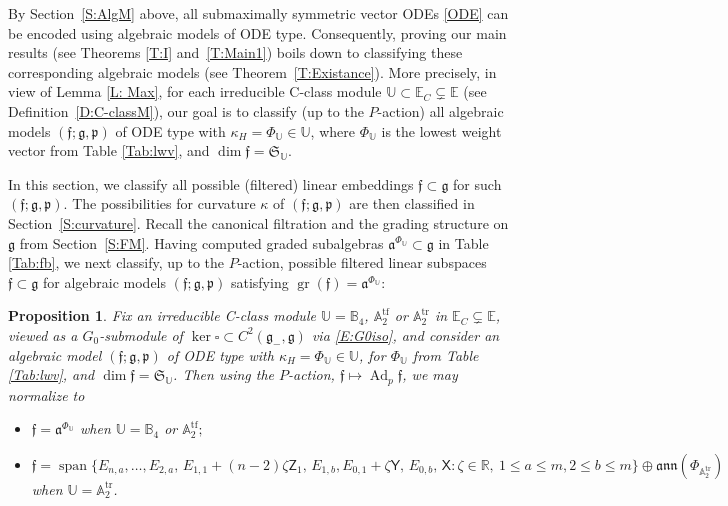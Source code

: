 \documentclass[10pt,a4paper]{amsart}
\DeclareMathOperator{\gr}{gr}
\DeclareMathOperator{\tf}{tf}
\DeclareMathOperator{\tr}{tr}
\DeclareMathOperator{\sn}{span}
\newcommand{\g}{\mathfrak{g}}
\newcommand\Ad{\operatorname{Ad}}
\renewcommand\gr{\operatorname{gr}}
\newcommand\fa{\mathfrak{a}}
\newcommand\fann{\mathfrak{ann}}
\newcommand\ff{\mathfrak{f}}
\newcommand\fg{\mathfrak{g}}
\newcommand\fp{\mathfrak{p}}
\newcommand\fS{\mathfrak{S}}
\newcommand{\R}{\mathbb{R}}
\newcommand\bbE{\mathbb{E}}
\newcommand\bbU{\mathbb{U}}
\newcommand\bbA{\mathbb{A}}
\newcommand\bbB{\mathbb{B}}
\newcommand\sfX{\mathsf{X}}
\newcommand\sfY{\mathsf{Y}}
\newcommand\sfZ{\mathsf{Z}}
\numberwithin{equation}{section}
\newtheorem{Proposition}[Theorem]{Proposition}
 { \theoremstyle{definition}
\newtheorem{Definition}[Theorem]{Definition}
\newtheorem{Note}[Theorem]{Note}
\newtheorem{Example}[Theorem]{Example}
\newtheorem{Remark}[Theorem]{Remark} }
\begin{document}
By Section~\ref{S:AlgM} above, all submaximally symmetric vector ODEs \eqref{ODE} can be encoded using algebraic models of ODE type. Consequently, proving our main results (see Theorems \ref{T:I} and~\ref{T:Main1}) boils down to classifying these corresponding algebraic models (see Theorem~\ref{T:Existance}). More precisely, in view of Lemma \ref{L: Max}, for each irreducible C-class module $\bbU \subset \bbE_C \subsetneq \bbE$ (see Definition~\ref{D:C-classM}), our goal is to classify (up to the $P$-action) all algebraic models $(\ff;\fg,\fp)$ of ODE type with $\kappa_H = \Phi_\bbU \in \bbU$, where $\Phi_\bbU$ is the lowest weight vector from Table \ref{Tab:lwv}, and $\dim \ff = \fS_\bbU$.

In this section, we classify all possible (filtered) linear embeddings $\ff \subset \fg$ for such $(\ff;\fg,\fp)$. The possibilities for curvature $\kappa$ of $(\ff;\fg,\fp)$ are then classified in Section~\ref{S:curvature}. Recall the canonical filtration and the grading structure on $\g$ from Section~\ref{S:FM}. Having computed graded subalgebras $\fa^{\Phi_\bbU} \subset \g$ in Table \ref{Tab:fb}, we next classify, up to the $P$-action, possible filtered linear subspaces $\ff \subset \g$ for algebraic models $(\ff;\fg,\fp)$ satisfying $\gr(\ff) = \fa^{\Phi_\bbU}$:

\begin{Proposition} \label{P:DR}
Fix an irreducible C-class module $\bbU = \bbB_4$, $\bbA_2^{\tf}$ or $\bbA_2^{\tr}$ in $\bbE_C \subsetneq \bbE$, viewed as a $G_0$-submodule of $\ker\square \subset C^2(\fg_-,\fg)$ via \eqref{E:G0iso}, and consider an algebraic model $(\ff;\fg,\fp)$ of ODE type with $ \kappa_H = \Phi_{\bbU}\in \bbU$, for $\Phi_\bbU$ from Table {\rm \ref{Tab:lwv}}, and $\dim \ff = \fS_{\bbU}$. Then using the $P$-action, $\ff \mapsto \Ad_p \ff$, we may normalize to
\begin{itemize}\itemsep=0pt
\item[$(a)$] $\ff = \fa^{\Phi_{\bbU}}$ when $\bbU = \bbB_4$ or $\bbA_2^{\tf};$
\item [$(b)$] $\ff = \sn\{E_{n,a}, \dots, E_{2,a},\, E_{1,1}+(n-2)\zeta\sfZ_1, \, E_{1,b}, E_{0,1}+\zeta\sfY,\, E_{0,b}, \, \sfX\colon \zeta \in \R,\ 1\le a \le m, \allowbreak 2 \le b \le m \} \oplus \fann (\Phi_{\bbA_2^{\tr}})$ when $\bbU = \bbA_2^{\tr}$.
\end{itemize}	
\end{Proposition}
\end{document}
